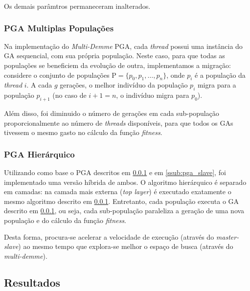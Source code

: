 \documentclass[12pt]{article}
\begin{document}
Os demais parâmtros permaneceram inalterados.


\subsubsection{PGA Multiplas Populações} %
\label{ssub:pga_mp}

Na implementação do \emph{Multi-Demme} PGA, cada \emph{thread} possui uma instância do GA sequencial, com sua própria população. Neste caso, para que todas as populações se beneficiem da evolução de outra, implementamos a migração: considere o conjunto de populações $\mathrm{P} = \lbrace p_0, p_1, \dots, p_n \rbrace$, onde $p_i$ é a população da \emph{thread} $i$. A cada $g$ gerações, o melhor indivíduo da população $p_i$ migra para a população $p_{i+1}$ (no caso de $i+1 = n$, o indivíduo migra para $p_0$).

Além disso, foi diminuido o número de gerações em cada sub-população proporcionalmente ao número de \emph{threads} disponíveis, para que todos os GAs tivessem o mesmo gasto no cálculo da função \emph{fitness}.


\subsubsection{PGA Hierárquico} %
\label{ssub:pga_h}

Utilizando como base o PGA descritos em \ref{ssub:pga_mp} e em \ref{ssub:pga_slave}, foi implementado uma versão híbrida de ambos. O algoritmo hierárquico é separado em camadas: na camada mais externa (\emph{top layer}) é executado exatamente o mesmo algoritmo descrito em \ref{ssub:pga_mp}. Entretanto, cada população executa o GA descrito em \ref{ssub:pga_mp}, ou seja, cada sub-população paraleliza a geração de uma nova população e do cálculo da função \emph{fitness}.

Desta forma, procura-se acelerar a velocidade de execução (através do \emph{master-slave}) ao mesmo tempo que explora-se melhor o espaço de busca (através do \emph{multi-demme}).

\subsection{Resultados} %
\label{sub:resultados}

\end{document}
